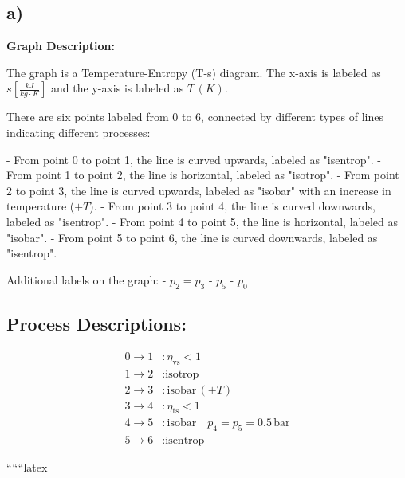 

\subsection*{a)}

\textbf{Graph Description:}

The graph is a Temperature-Entropy (T-s) diagram. The x-axis is labeled as \( s \left[ \frac{kJ}{kg \cdot K} \right] \) and the y-axis is labeled as \( T \, (K) \).

There are six points labeled from 0 to 6, connected by different types of lines indicating different processes:

- From point 0 to point 1, the line is curved upwards, labeled as "isentrop".
- From point 1 to point 2, the line is horizontal, labeled as "isotrop".
- From point 2 to point 3, the line is curved upwards, labeled as "isobar" with an increase in temperature (\(+T\)).
- From point 3 to point 4, the line is curved downwards, labeled as "isentrop".
- From point 4 to point 5, the line is horizontal, labeled as "isobar".
- From point 5 to point 6, the line is curved downwards, labeled as "isentrop".

Additional labels on the graph:
- \( p_2 = p_3 \)
- \( p_5 \)
- \( p_0 \)

\subsection*{Process Descriptions:}

\begin{align*}
0 \rightarrow 1 &: \eta_{\text{vs}} < 1 \\
1 \rightarrow 2 &: \text{isotrop} \\
2 \rightarrow 3 &: \text{isobar} \, (+T) \\
3 \rightarrow 4 &: \eta_{\text{ts}} < 1 \\
4 \rightarrow 5 &: \text{isobar} \quad p_4 = p_5 = 0.5 \, \text{bar} \\
5 \rightarrow 6 &: \text{isentrop}
\end{align*}

``````latex
